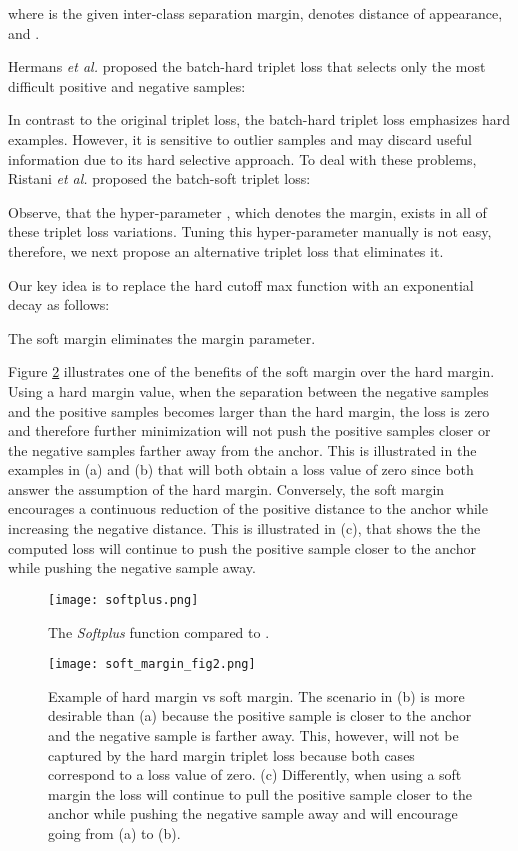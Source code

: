 \documentclass[sigconf]{acmart}
\begin{document}
where  is the given inter-class separation margin,  denotes distance of appearance, and .


Hermans \textit{et al.} \cite{hermans2017defense} proposed the batch-hard triplet loss that selects only the most difficult positive and negative samples:

In contrast to the original triplet loss, the batch-hard triplet loss emphasizes hard examples. However, it is sensitive to outlier samples and may discard useful information due to its hard selective approach.
To deal with these problems, Ristani \textit{et al.} proposed the batch-soft triplet loss:


Observe, that the hyper-parameter , which denotes the margin, exists in all of these triplet loss variations.
Tuning this hyper-parameter manually is not easy, therefore, we next propose an alternative triplet loss that eliminates it.

Our key idea is to replace the hard cutoff max function with an exponential decay  as follows:

The soft margin eliminates the margin parameter.

Figure \ref{fig:soft_margin} illustrates one of the benefits of the soft margin over the hard margin.
Using a hard margin value, when the separation between the negative samples and the positive samples becomes larger than the hard margin, the loss is zero and therefore further minimization will not push the positive samples closer or the negative samples farther away from the anchor.
This is illustrated in the examples in (a) and (b) that will both obtain a loss value of zero since both answer the assumption of the hard margin.
Conversely, the soft margin encourages a continuous reduction of the positive distance to the anchor while increasing the negative distance.
This is illustrated in (c), that shows the the computed loss will continue to push the positive sample closer to the anchor while pushing the negative sample away.
\begin{figure}
\centering
\texttt{[image: softplus.png]}
\caption{The \textit{Softplus} function  compared to  .}
\label{fig:softplus}
\end{figure}

\begin{figure}
\centering
\texttt{[image: soft\_margin\_fig2.png]}
\caption{Example of hard margin vs soft margin.
The scenario in (b) is more desirable than (a) because the positive sample is closer to the anchor and the negative sample is farther away. This, however, will not be captured by the hard margin triplet loss because both cases correspond to a loss value of zero.
(c) Differently, when using a soft margin the loss will continue to pull the positive sample closer to the anchor while pushing the negative sample away and will encourage going from (a) to (b). }
\label{fig:soft_margin}
\end{figure}
\end{document}
